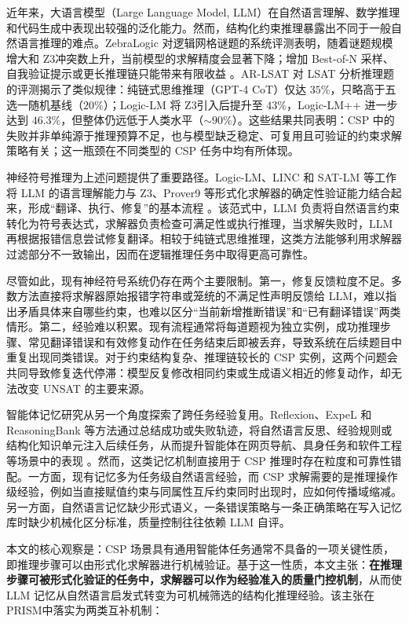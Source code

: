 \documentclass[UTF8,a4paper,12pt]{ctexart}
\newcommand{\PRISM}{PRISM}
\newcommand{\zthree}{Z3}
\begin{document}
近年来，大语言模型（Large Language Model, LLM）在自然语言理解、数学推理和代码生成中表现出较强的泛化能力。然而，结构化约束推理暴露出不同于一般自然语言推理的难点。ZebraLogic 对逻辑网格谜题的系统评测表明，随着谜题规模增大和 \zthree 冲突数上升，当前模型的求解精度会显著下降；增加 Best-of-N 采样、自我验证提示或更长推理链只能带来有限收益 \cite{lin2025}。AR-LSAT 对 LSAT 分析推理题的评测揭示了类似规律：纯链式思维推理（GPT-4 CoT）仅达 \(35\%\)，只略高于五选一随机基线（\(20\%\)）；Logic-LM 将 \zthree 引入后提升至 \(43\%\)，Logic-LM++ 进一步达到 \(46.3\%\)，但整体仍远低于人类水平（\(\sim90\%\)）\cite{pan2023,kirtania2024}。这些结果共同表明：CSP 中的失败并非单纯源于推理预算不足，也与模型缺乏稳定、可复用且可验证的约束求解策略有关；这一瓶颈在不同类型的 CSP 任务中均有所体现。

神经符号推理为上述问题提供了重要路径。Logic-LM、LINC 和 SAT-LM 等工作将 LLM 的语言理解能力与 \zthree、Prover9 等形式化求解器的确定性验证能力结合起来，形成“翻译、执行、修复”的基本流程 \cite{pan2023,olausson2023,ye2023}。该范式中，LLM 负责将自然语言约束转化为符号表达式，求解器负责检查可满足性或执行推理，当求解失败时，LLM 再根据报错信息尝试修复翻译。相较于纯链式思维推理，这类方法能够利用求解器过滤部分不一致输出，因而在逻辑推理任务中取得更高可靠性。

尽管如此，现有神经符号系统仍存在两个主要限制。第一，修复反馈粒度不足。多数方法直接将求解器原始报错字符串或笼统的不满足性声明反馈给 LLM，难以指出矛盾具体来自哪些约束，也难以区分“当前新增推断错误”和“已有翻译错误”两类情形。第二，经验难以积累。现有流程通常将每道题视为独立实例，成功推理步骤、常见翻译错误和有效修复动作在任务结束后即被丢弃，导致系统在后续题目中重复出现同类错误。对于约束结构复杂、推理链较长的 CSP 实例，这两个问题会共同导致修复迭代停滞：模型反复修改相同约束或生成语义相近的修复动作，却无法改变 UNSAT 的主要来源。

智能体记忆研究从另一个角度探索了跨任务经验复用。Reflexion、ExpeL 和 ReasoningBank 等方法通过总结成功或失败轨迹，将自然语言反思、经验规则或结构化知识单元注入后续任务，从而提升智能体在网页导航、具身任务和软件工程等场景中的表现 \cite{shinn2023,zhao2024,ouyang2025}。然而，这类记忆机制直接用于 CSP 推理时存在粒度和可靠性错配。一方面，现有记忆多为任务级自然语言经验，而 CSP 求解需要的是推理操作级经验，例如当直接赋值约束与同属性互斥约束同时出现时，应如何传播域缩减。另一方面，自然语言记忆缺少形式语义，一条错误策略与一条正确策略在写入记忆库时缺少机械化区分标准，质量控制往往依赖 LLM 自评。

本文的核心观察是：CSP 场景具有通用智能体任务通常不具备的一项关键性质，即推理步骤可以由形式化求解器进行机械验证。基于这一性质，本文主张：\textbf{在推理步骤可被形式化验证的任务中，求解器可以作为经验准入的质量门控机制}，从而使 LLM 记忆从自然语言启发式转变为可机械筛选的结构化推理经验。该主张在 \PRISM 中落实为两类互补机制：
\end{document}
